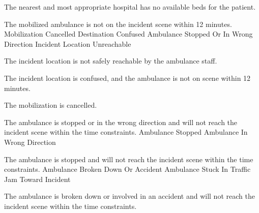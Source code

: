   \startkaosspec
  	 {The nearest and most appropriate hospital has no available beds for the patient.}
  \stopkaosspec
  
  
    {}
  
  \startkaosspec
  	 {The mobilized ambulance is not on the incident scene within 12 minutes.}
  	 {Mobilization Cancelled}
  	 {Destination Confused}
  	 {Ambulance Stopped Or In Wrong Direction}
  	 {Incident Location Unreachable}
  \stopkaosspec
  
  \startkaosspec
  	 {The incident location is not safely reachable by the ambulance staff.}
  \stopkaosspec
  
  \startkaosspec
  	 {The incident location is confused, and the ambulance is not on scene within 12 minutes.}
  \stopkaosspec
  
  \startkaosspec
  	 {The mobilization is cancelled.}
  \stopkaosspec
  
  \startkaosspec
  	 {The ambulance is stopped or in the wrong direction and will not reach the incident scene within the time constraints.}
  	 {Ambulance Stopped}
  	 {Ambulance In Wrong Direction}
  \stopkaosspec
  
  \startkaosspec
  	 {The ambulance is stopped and will not reach the incident scene within the time constraints.}
  	 {Ambulance Broken Down Or Accident}
  	 {Ambulance Stuck In Traffic Jam Toward Incident}
  \stopkaosspec
  
  \startkaosspec
  	 {The ambulance is broken down or involved in an accident and will not reach the incident scene within the time constraints.}
  \stopkaosspec
  
